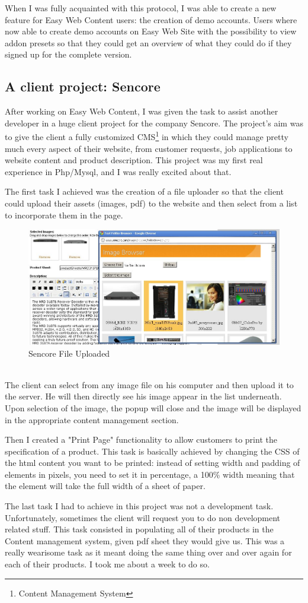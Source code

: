 When I was fully acquainted with this protocol, I was able to create a new feature for Easy Web Content users: the creation of demo accounts. Users where now able to create demo accounts on Easy Web Site with the possibility to view addon presets so that they could get an overview of what they could do if they signed up for the complete version.


\subsection{A client project: Sencore}
After working on Easy Web Content, I was given the task to assist another developer in a huge client project for the company Sencore. The project's aim was to give the client a fully customized CMS\footnote{Content Management System} in which they could manage pretty much every aspect of their website, from customer requests, job applications to website content and product description. This project was my first real experience in Php/Mysql, and I was really excited about that.

The first task I achieved was the creation of a file uploader so that the client could upload their assets (images, pdf) to the website and then select from a list to incorporate them in the page.
\begin{figure}[!ht]
\centering
\includegraphics[width=.55\textwidth]{img/sencore.jpg}
\caption{Sencore File Uploaded}
\label{figure:sencore_uploader}
\end{figure}
\\The client can select from any image file on his computer and then upload it to the server. He will then directly see his image appear in the list underneath. Upon selection of the image, the popup will close and the image will be displayed in the appropriate content management section.

Then I created a "Print Page" functionality to allow customers to print the specification of a product. This task is basically achieved by changing the CSS of the html content you want to be printed: instead of setting width and padding of elements in pixels, you need to set it in percentage, a 100\% width meaning that the element will take the full width of a sheet of paper.

The last task I had to achieve in this project was not a development task. Unfortunately, sometimes the client will request you to do non development related stuff. This task consisted in populating all of their products in the Content management system, given pdf sheet they would give us. This was a really wearisome task as it meant doing the same thing over and over again for each of their products. I took me about a week to do so.
